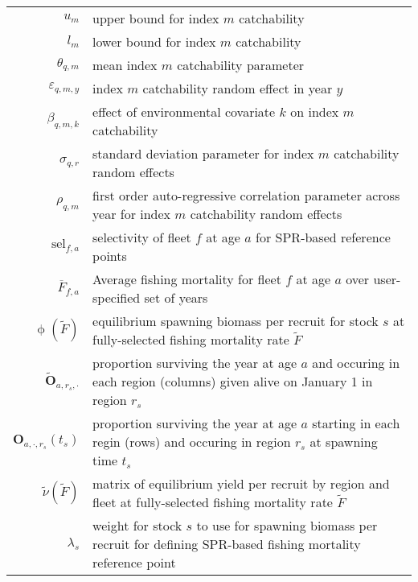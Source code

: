 \begin{longtable}[c]{r p{}}
$u_{m}$ & upper bound for index $m$ catchability\\
$l_{m}$ & lower bound for index $m$ catchability\\
$\theta_{q,m}$ & mean index $m$ catchability parameter\\
$\varepsilon_{q,m,y}$ & index $m$ catchability random effect in year $y$\\
$\beta_{q,m,k}$ & effect of environmental covariate $k$ on index $m$ catchability\\
$\sigma_{q,r}$ & standard deviation parameter for index $m$ catchability random effects\\
$\rho_{q,m}$ & first order auto-regressive correlation parameter across year for index $m$ catchability random effects\\
$\text{sel}_{f,a}$ & selectivity of fleet $f$ at age $a$ for SPR-based reference points\\
$\overline{F}_{f,a}$ & Average fishing mortality for fleet $f$ at age $a$ over user-specified set of years\\
$\upphi(\widetilde{F})$ & equilibrium spawning biomass per recruit for stock $s$ at fully-selected fishing mortality rate $\widetilde{F}$\\
$\widetilde{\mathbf{O}}_{a,r_s,\cdot}$ & proportion surviving the year at age $a$ and occuring in each region (columns) given alive on January 1 in region $r_s$\\
$\mathbf{O}_{a,\cdot,r_s}(t_s)$ & proportion surviving the year at age $a$ starting in each regin (rows) and occuring in region $r_s$ at spawning time $t_s$\\
$\widetilde{\nu}({\widetilde{F}})$ & matrix of equilibrium yield per recruit by region and fleet at fully-selected fishing mortality rate $\widetilde{F}$\\
$\lambda_s$ & weight for stock $s$ to use for spawning biomass per recruit for defining SPR-based fishing mortality reference point
\end{longtable}
